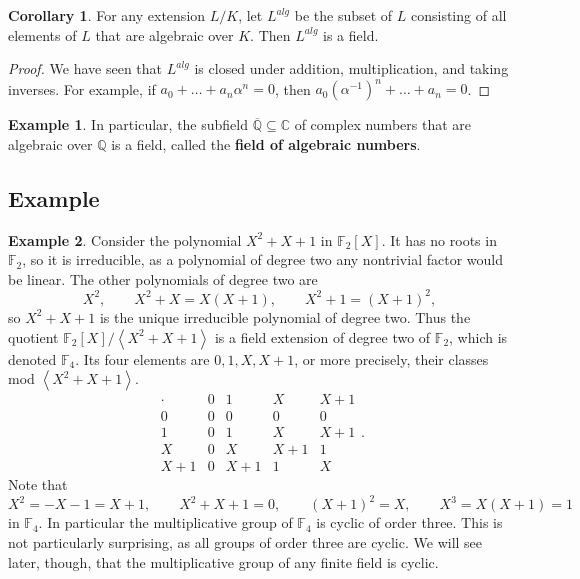\documentclass{article}
\newcommand{\F}{\mathbb{F}}
\newcommand{\Q}{\mathbb{Q}}
\newcommand{\C}{\mathbb{C}}
\newcommand{\rb}[1]{\left( #1 \right)}
\renewcommand{\sb}[1]{\left[ #1 \right]}
\newcommand{\ab}[1]{\left\langle #1 \right\rangle}
\theoremstyle{definition}\newtheorem{definition}{Definition}[subsection]
\theoremstyle{definition}\newtheorem{remark}[definition]{Remark}
\theoremstyle{definition}\newtheorem*{example}{Example}
\theoremstyle{definition}\newtheorem*{note}{Note}
\newtheorem{corollary}[definition]{Corollary}
\begin{document}
\begin{corollary}
For any extension $ L / K $, let $ L^{alg} $ be the subset of $ L $ consisting of all elements of $ L $ that are algebraic over $ K $. Then $ L^{alg} $ is a field.
\end{corollary}

\begin{proof}
We have seen that $ L^{alg} $ is closed under addition, multiplication, and taking inverses. For example, if $ a_0 + \dots + a_n\alpha^n = 0 $, then $ a_0\rb{\alpha^{-1}}^n + \dots + a_n = 0 $.
\end{proof}

\begin{example}
In particular, the subfield $ \overline{\Q} \subseteq \C $ of complex numbers that are algebraic over $ \Q $ is a field, called the \textbf{field of algebraic numbers}.
\end{example}

\subsection{Example}

\begin{example}
Consider the polynomial $ X^2 + X + 1 $ in $ \F_2\sb{X} $. It has no roots in $ \F_2 $, so it is irreducible, as a polynomial of degree two any nontrivial factor would be linear. The other polynomials of degree two are
$$ X^2, \qquad X^2 + X = X\rb{X + 1}, \qquad X^2 + 1 = \rb{X + 1}^2, $$
so $ X^2 + X + 1 $ is the unique irreducible polynomial of degree two. Thus the quotient $ \F_2\sb{X} / \ab{X^2 + X + 1} $ is a field extension of degree two of $ \F_2 $, which is denoted $ \F_4 $. Its four elements are $ 0, 1, X, X + 1 $, or more precisely, their classes mod $ \ab{X^2 + X + 1} $.
$$
\begin{array}{c|cccc}
\cdot & 0 & 1 & X & X + 1 \\
\hline
0 & 0 & 0 & 0 & 0 \\
1 & 0 & 1 & X & X + 1 \\
X & 0 & X & X + 1 & 1 \\
X + 1 & 0 & X + 1 & 1 & X
\end{array}.
$$
Note that
$$ X^2 = -X - 1 = X + 1, \qquad X^2 + X + 1 = 0, \qquad \rb{X + 1}^2 = X, \qquad X^3 = X\rb{X + 1} = 1 $$
in $ \F_4 $. In particular the multiplicative group of $ \F_4 $ is cyclic of order three. This is not particularly surprising, as all groups of order three are cyclic. We will see later, though, that the multiplicative group of any finite field is cyclic.
\end{example}
\end{document}
